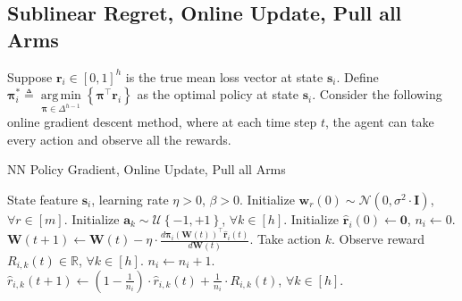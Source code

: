 \documentclass[10pt]{article}
\def\rva{{\mathbf{a}}}
\def\rvr{{\mathbf{r}}}
\def\rvs{{\mathbf{s}}}
\def\rvw{{\mathbf{w}}}
\def\rvzero{{\mathbf{0}}}
\def\rvpi{{\boldsymbol{\pi}}}
\def\rmI{{\mathbf{I}}}
\def\rmW{{\mathbf{W}}}
\def\sR{{\mathbb{R}}}
\def\gN{{\mathcal{N}}}
\def\gU{{\mathcal{U}}}
\DeclareMathOperator*{\argmin}{arg\,min}
\begin{document}
\subsection{Sublinear Regret, Online Update, Pull all Arms}

Suppose $\rvr_i \in \left[ 0, 1\right]^h$ is the true mean loss vector at state $\rvs_i$. Define $\rvpi_i^* \triangleq \argmin\limits_{\rvpi \in \Delta^{h-1}}{ \left\{ \rvpi^\top \rvr_i \right\} }$ as the optimal policy at state $\rvs_i$. Consider the following online gradient descent method, where at each time step $t$, the agent can take every action and observe all the rewards.

\begin{algorithm}[h]
   \caption{NN Policy Gradient, Online Update, Pull all Arms}
\label{alg:policy_gradient_online_pull_all_arms}
\begin{algorithmic}
    State feature $\rvs_i$, learning rate $\eta > 0$, $\beta > 0$.
   \STATE Initialize $\rvw_r(0) \sim \gN\left( 0, \sigma^2 \cdot \rmI \right)$, $\forall r \in [m]$. \STATE Initialize $\rva_k \sim \gU\left\{-1, +1\right\}$, $\forall k \in [h]$.
   \STATE Initialize $\hat{\rvr}_{i}(0) \gets \rvzero$, $n_{i} \gets 0$.
   \STATE $\rmW(t+1) \leftarrow \rmW(t) - \eta \cdot \frac{d \rvpi_{i}\left(\rmW(t)\right)^\top \hat{\rvr}_i(t)}{d \rmW(t)}$.
   \STATE Take action $k$. Observe reward $R_{i,k}(t) \in \sR$, $\forall k \in [h]$.
   \STATE $n_i \gets n_i + 1$.
   \STATE $\hat{r}_{i, k}(t+1) \gets \left( 1 - \frac{1}{n_i} \right) \cdot \hat{r}_{i,k}(t) + \frac{1}{n_i} \cdot R_{i,k}(t)$, $\forall k \in [h]$.
   \ENDFOR
\end{algorithmic}
\end{algorithm}
\end{document}
